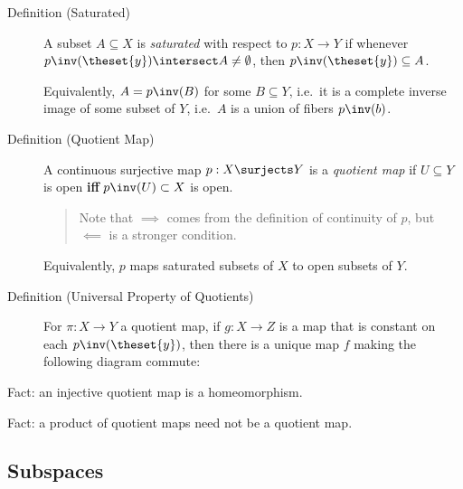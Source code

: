 \begin{description}
\item[Definition (Saturated)]
A subset \(A\subseteq X\) is \emph{saturated} with respect to
\(p:X\to Y\) if whenever
\(p\inv(\theset{y}) \intersect A \neq \emptyset\), then
\(p\inv(\theset{y}) \subseteq A\).

Equivalently, \(A = p\inv(B)\) for some \(B\subseteq Y\), i.e.~it is a
complete inverse image of some subset of \(Y\), i.e.~\(A\) is a union of
fibers \(p\inv(b)\).
\item[Definition (Quotient Map)]
A continuous surjective map \(p: X\surjects Y\) is a \emph{quotient map}
if \(U\subseteq Y\) is open \textbf{iff} \(p\inv(U) \subset X\) is open.

\begin{quote}
Note that \(\implies\) comes from the definition of continuity of \(p\),
but \(\impliedby\) is a stronger condition.
\end{quote}

Equivalently, \(p\) maps saturated subsets of \(X\) to open subsets of
\(Y\).
\item[Definition (Universal Property of Quotients)]
For \(\pi :X\to Y\) a quotient map, if \(g:X\to Z\) is a map that is
constant on each \(p\inv(\theset{y})\), then there is a unique map \(f\)
making the following diagram commute:

\begin{center}
\end{center}
\end{description}

Fact: an injective quotient map is a homeomorphism.

Fact: a product of quotient maps need not be a quotient map.

\hypertarget{subspaces}{%
\subsection{Subspaces}\label{subspaces}}

